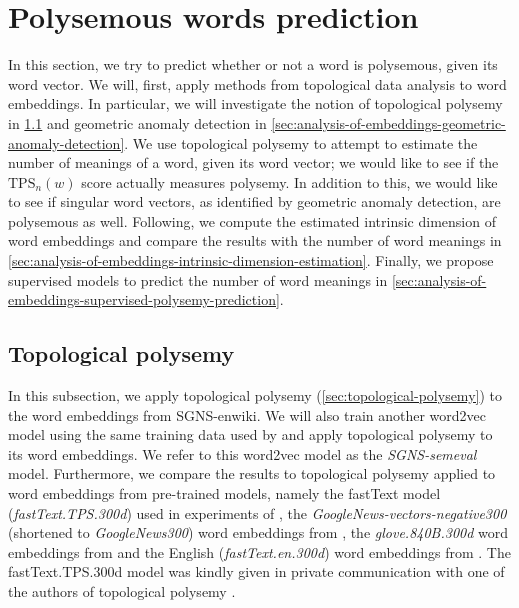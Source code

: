 \section{Polysemous words prediction}
\label{sec:polysemous-words-prediction}
In this section, we try to predict whether or not a word is polysemous, given its word vector. We will, first, apply methods from topological data analysis to word embeddings. In particular, we will investigate the notion of topological polysemy in \cref{sec:analysis-of-embeddings-topological-polysemy} and geometric anomaly detection in \cref{sec:analysis-of-embeddings-geometric-anomaly-detection}. We use topological polysemy to attempt to estimate the number of meanings of a word, given its word vector; we would like to see if the $\text{TPS}_n(w)$ score actually measures polysemy. In addition to this, we would like to see if singular word vectors, as identified by geometric anomaly detection, are polysemous as well. Following, we compute the estimated intrinsic dimension of word embeddings and compare the results with the number of word meanings in \cref{sec:analysis-of-embeddings-intrinsic-dimension-estimation}. Finally, we propose supervised models to predict the number of word meanings in \cref{sec:analysis-of-embeddings-supervised-polysemy-prediction}.

\subsection{Topological polysemy}
\label{sec:analysis-of-embeddings-topological-polysemy}
In this subsection, we apply topological polysemy (\cref{sec:topological-polysemy}) to the word embeddings from SGNS-enwiki. We will also train another word2vec model using the same training data used by \cite{jakubowski2020topology} and apply topological polysemy to its word embeddings. We refer to this word2vec model as the \textit{SGNS-semeval} model. Furthermore, we compare the results to topological polysemy applied to word embeddings from pre-trained models, namely the fastText model (\textit{fastText.TPS.300d}) used in experiments of \cite{jakubowski2020topology}, the \textit{GoogleNews-vectors-negative300} (shortened to \textit{GoogleNews300}) word embeddings from \cite{GoogleCodeArchiveWord2vec}, the \textit{glove.840B.300d} word embeddings from \cite{GloVeProject2014} and the English (\textit{fastText.en.300d}) word embeddings from \cite{grave2018learning}. The fastText.TPS.300d model was kindly given in private communication with one of the authors of topological polysemy \cite{ZibrowiusPrivComs2021}.

